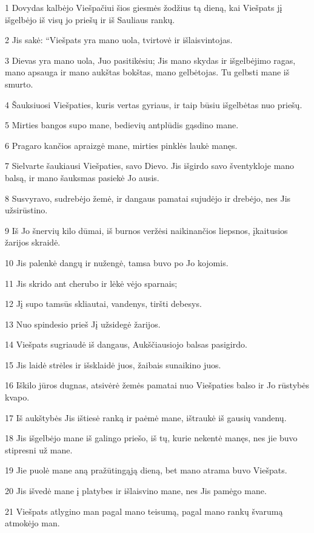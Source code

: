 \par 1 Dovydas kalbėjo Viešpačiui šios giesmės žodžius tą dieną, kai Viešpats jį išgelbėjo iš visų jo priešų ir iš Sauliaus rankų. 
\par 2 Jis sakė: “Viešpats yra mano uola, tvirtovė ir išlaisvintojas. 
\par 3 Dievas yra mano uola, Juo pasitikėsiu; Jis mano skydas ir išgelbėjimo ragas, mano apsauga ir mano aukštas bokštas, mano gelbėtojas. Tu gelbsti mane iš smurto. 
\par 4 Šauksiuosi Viešpaties, kuris vertas gyriaus, ir taip būsiu išgelbėtas nuo priešų. 
\par 5 Mirties bangos supo mane, bedievių antplūdis gąsdino mane. 
\par 6 Pragaro kančios apraizgė mane, mirties pinklės laukė manęs. 
\par 7 Sielvarte šaukiausi Viešpaties, savo Dievo. Jis išgirdo savo šventykloje mano balsą, ir mano šauksmas pasiekė Jo ausis. 
\par 8 Susvyravo, sudrebėjo žemė, ir dangaus pamatai sujudėjo ir drebėjo, nes Jis užsirūstino. 
\par 9 Iš Jo šnervių kilo dūmai, iš burnos veržėsi naikinančios liepsnos, įkaitusios žarijos skraidė. 
\par 10 Jis palenkė dangų ir nužengė, tamsa buvo po Jo kojomis. 
\par 11 Jis skrido ant cherubo ir lėkė vėjo sparnais; 
\par 12 Jį supo tamsūs skliautai, vandenys, tiršti debesys. 
\par 13 Nuo spindesio prieš Jį užsidegė žarijos. 
\par 14 Viešpats sugriaudė iš dangaus, Aukščiausiojo balsas pasigirdo. 
\par 15 Jis laidė strėles ir išsklaidė juos, žaibais sunaikino juos. 
\par 16 Iškilo jūros dugnas, atsivėrė žemės pamatai nuo Viešpaties balso ir Jo rūstybės kvapo. 
\par 17 Iš aukštybės Jis ištiesė ranką ir paėmė mane, ištraukė iš gausių vandenų. 
\par 18 Jis išgelbėjo mane iš galingo priešo, iš tų, kurie nekentė manęs, nes jie buvo stipresni už mane. 
\par 19 Jie puolė mane aną pražūtingąją dieną, bet mano atrama buvo Viešpats. 
\par 20 Jis išvedė mane į platybes ir išlaisvino mane, nes Jis pamėgo mane. 
\par 21 Viešpats atlygino man pagal mano teisumą, pagal mano rankų švarumą atmokėjo man. 
